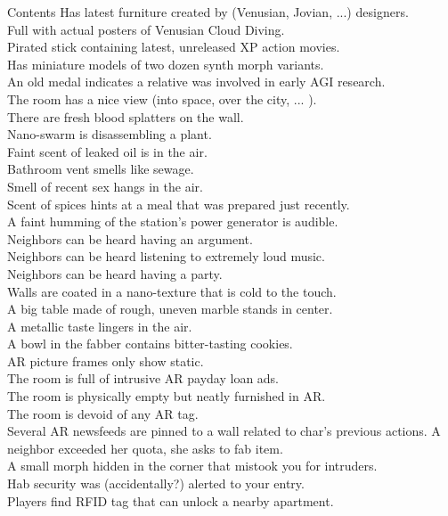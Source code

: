 \documentclass[a4]{article}
\begin{document}
\begin{tableone}{Contents}
Has latest furniture created by (Venusian, Jovian, ...) designers.\\
Full with actual posters of Venusian Cloud Diving.\\
Pirated stick containing latest, unreleased XP action movies.\\
Has miniature models of two dozen synth morph variants.\\
An old medal indicates a relative was involved in early AGI research.\\
The room has a nice view (into space, over the city, ... ).\\
There are fresh blood splatters on the wall.\\
Nano-swarm is disassembling a plant.\\
Faint scent of leaked oil is in the air.\\
Bathroom vent smells like sewage.\\
Smell of recent sex hangs in the air.\\
Scent of spices hints at a meal that was prepared just recently.\\
A faint humming of the station's power generator is audible.\\
Neighbors can be heard having an argument.\\
Neighbors can be heard listening to extremely loud music.\\
Neighbors can be heard having a party.\\
Walls are coated in a nano-texture that is cold to the touch.\\
A big table made of rough, uneven marble stands in center.\\
A metallic taste lingers in the air.\\
A bowl in the fabber contains bitter-tasting cookies.\\
AR picture frames only show static.\\
The room is full of intrusive AR payday loan ads.\\
The room is physically empty but neatly furnished in AR.\\
The room is devoid of any AR tag.\\
Several AR newsfeeds are pinned to a wall related to char's previous actions.
A neighbor exceeded her quota, she asks to fab item.\\
A small  morph hidden in the corner that mistook you for intruders.\\
Hab security was (accidentally?) alerted to your entry.\\
Players find RFID tag that can unlock a nearby apartment.\\
\end{tableone}
\end{document}
